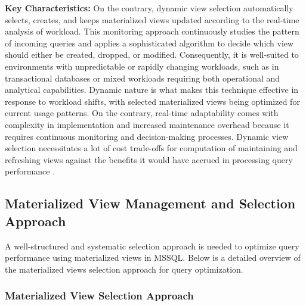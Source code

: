 \begin{enumerate}
    \textbf{Key Characteristics:} On the contrary, dynamic view selection automatically selects, creates, and keeps materialized views updated according to the real-time analysis of workload. This monitoring approach continuously studies the pattern of incoming queries and applies a sophisticated algorithm to decide which view should either be created, dropped, or modified. Consequently, it is well-suited to environments with unpredictable or rapidly changing workloads, such as in transactional databases or mixed workloads requiring both operational and analytical capabilities. Dynamic nature is what makes this technique effective in response to workload shifts, with selected materialized views being optimized for current usage patterns. On the contrary, real-time adaptability comes with complexity in implementation and increased maintenance overhead because it requires continuous monitoring and decision-making processes. Dynamic view selection necessitates a lot of cost trade-offs for computation of maintaining and refreshing views against the benefits it would have accrued in processing query performance \cite{lohman2000selftuning,mamoulis2012survey,gupta2002selftuning}.
\end{enumerate}

\subsection{ Materialized View Management and Selection Approach}

A well-structured and systematic selection approach is needed to optimize query performance using materialized views in MSSQL. Below is a detailed overview of the materialized views selection approach for query optimization.

\subsubsection{Materialized View Selection Approach}
  
